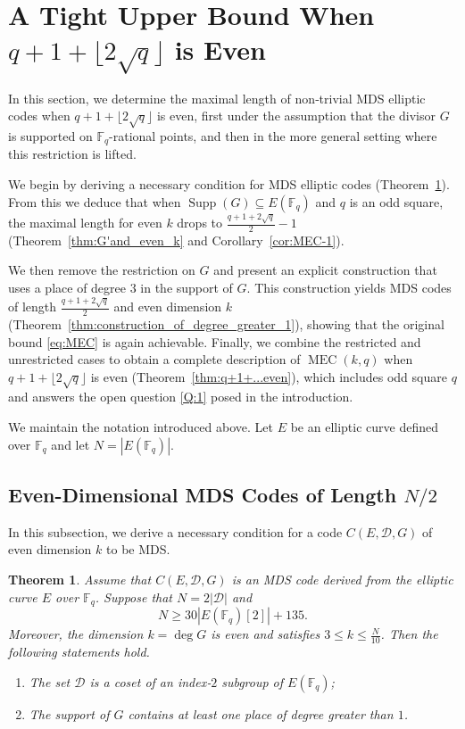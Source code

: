 \documentclass[journal,12pt,onecolumn]{IEEEtran}
\newtheorem{theorem}{Theorem}
\begin{document}
\section{A Tight Upper Bound When $q+1+ \lfloor 2\sqrt{q} \rfloor$ is Even}\label{sec:A_tight_upper_bound_for_even_k}
In this section, we determine the maximal length of non‑trivial MDS elliptic codes when $q+1+ \lfloor 2\sqrt{q} \rfloor$ is even, first under the assumption that the divisor $G$ is supported on $\mathbb{F}_q$-rational points, and then in the more general setting where this restriction is lifted.

We begin by deriving a necessary condition for MDS elliptic codes (Theorem~\ref{thm:main_theorem}). From this we deduce that when $\operatorname{Supp}(G)\subseteq E(\mathbb{F}_q)$ and $q$ is an odd square, the maximal length for even $k$ drops to $\frac{q+1+2\sqrt{q}}{2}-1$ (Theorem~\ref{thm:G'and_even_k} and Corollary~\ref{cor:MEC-1}). 

We then remove the restriction on $G$ and present an explicit construction that uses a place of degree $3$ in the support of $G$. This construction yields MDS codes of length $\frac{q+1+2\sqrt{q}}{2}$ and even dimension $k$ (Theorem~\ref{thm:construction_of_degree_greater_1}), showing that the original bound \eqref{eq:MEC} is again achievable. Finally, we combine the restricted and unrestricted cases to obtain a complete description of $\operatorname{MEC}(k,q)$ when $q+1+\lfloor 2\sqrt{q}\rfloor$ is even (Theorem~\ref{thm:q+1+...even}), which includes odd square $q$ and answers the open question \ref{Q:1} posed in the introduction.

We maintain the notation introduced above. Let $E$ be an elliptic curve defined over $\mathbb{F}_q$ and let $N=|E(\mathbb{F}_q)|$. 


\subsection{Even-Dimensional MDS Codes of Length $N/2$}
In this subsection, we derive a necessary condition for a code $C(E, \mathcal{D}, G)$ of even dimension $k$ to be MDS.

\begin{theorem}\label{thm:main_theorem}
    Assume that $C(E, \mathcal{D}, G)$ is an MDS code derived from the elliptic curve $ E $ over $\mathbb{F}_q$. Suppose that $ N = 2 |\mathcal{D}|$ and
    \[
    N \ge 30|E(\mathbb{F}_q)[2]| + 135.
    \]
    Moreover, the dimension $k = \deg G$ is even and satisfies
    $
    3 \le k \le \frac{N}{10}
    $. 
    Then the following statements hold.  
     \begin{enumerate}
     \item The set $\mathcal{D}$ is a coset of an index‑$2$ subgroup of $E(\mathbb{F}_q)$;
     \item The support of $G$ contains at least one place of degree greater than $1$.
     \end{enumerate}
\end{theorem}
\end{document}

